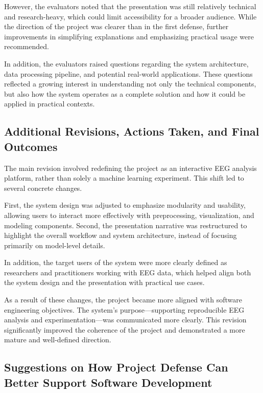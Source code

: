 However, the evaluators noted that the presentation was still relatively technical and research-heavy, which could limit accessibility for a broader audience. While the direction of the project was clearer than in the first defense, further improvements in simplifying explanations and emphasizing practical usage were recommended.

In addition, the evaluators raised questions regarding the system architecture, data processing pipeline, and potential real-world applications. These questions reflected a growing interest in understanding not only the technical components, but also how the system operates as a complete solution and how it could be applied in practical contexts.

\subsection{Additional Revisions, Actions Taken, and Final Outcomes}
\label{subsec:second-defense-revisions}

The main revision involved redefining the project as an interactive EEG analysis platform, rather than solely a machine learning experiment. This shift led to several concrete changes.

First, the system design was adjusted to emphasize modularity and usability, allowing users to interact more effectively with preprocessing, visualization, and modeling components. Second, the presentation narrative was restructured to highlight the overall workflow and system architecture, instead of focusing primarily on model-level details.

In addition, the target users of the system were more clearly defined as researchers and practitioners working with EEG data, which helped align both the system design and the presentation with practical use cases.

As a result of these changes, the project became more aligned with software engineering objectives. The system's purpose---supporting reproducible EEG analysis and experimentation---was communicated more clearly. This revision significantly improved the coherence of the project and demonstrated a more mature and well-defined direction.

\subsection{Suggestions on How Project Defense Can Better Support Software Development}
\label{subsec:defense-suggestions}

